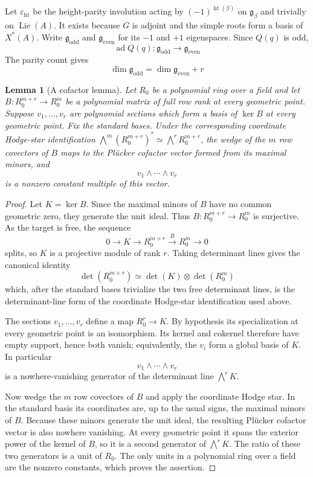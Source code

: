 \documentclass[11pt]{amsart}
\newtheorem{lemma}[lemma]{Lemma}
\theoremstyle{definition}
\theoremstyle{remark}
\newcommand{\Lie}{\operatorname{Lie}}
\newcommand{\ad}{\operatorname{ad}}
\newcommand{\g}{\mathfrak g}
\begin{document}
Let $\varepsilon_{\mathrm{ht}}$ be the height-parity involution acting by
$(-1)^{\operatorname{ht}(\beta)}$ on $\g_\beta$ and trivially on $\Lie(A)$.
It exists because $G$ is adjoint and the simple roots form a basis of
$X^*(A)$.  Write $\g_{\mathrm{odd}}$ and $\g_{\mathrm{even}}$ for its
$-1$ and $+1$ eigenspaces.  Since $Q(q)$ is odd,
\[
 \ad Q(q):\g_{\mathrm{odd}}\longrightarrow\g_{\mathrm{even}}
\]
The parity count gives
\begin{equation}\label{eq:g-parity-dimension}
 \dim\g_{\mathrm{odd}}=\dim\g_{\mathrm{even}}+r
\end{equation}

\begin{lemma}[A cofactor lemma]\label{lem:cofactor-kernel}
Let $R_0$ be a polynomial ring over a field and let
$B:R_0^{m+r}\to R_0^m$ be a polynomial matrix of full row rank at every
geometric point.  Suppose $v_1,\ldots,v_r$ are polynomial sections which form
a basis of $\ker B$ at every geometric point.  Fix the standard bases.  Under the corresponding coordinate Hodge-star
identification
$\bigwedge^m(R_0^{m+r})^*\simeq\bigwedge^rR_0^{m+r}$, the wedge of the
$m$ row covectors of $B$ maps to the Pl\"ucker cofactor vector formed from
its maximal minors, and
\[
 v_1\wedge\cdots\wedge v_r
\]
is a nonzero constant multiple of this vector.
\end{lemma}

\begin{proof}
Let $K=\ker B$.  Since the maximal minors of $B$ have no common geometric
zero, they generate the unit ideal.  Thus $B:R_0^{m+r}\to R_0^m$ is
surjective.  As the target is free, the sequence
\[
 0\longrightarrow K\longrightarrow R_0^{m+r}
 \xrightarrow{B}R_0^m\longrightarrow0
\]
splits, so $K$ is a projective module of rank $r$.  Taking determinant lines
gives the canonical identity
\[
 \det(R_0^{m+r})\simeq \det(K)\otimes\det(R_0^m)
\]
which, after the standard bases trivialize the two free determinant lines, is
the determinant-line form of the coordinate Hodge-star identification used
above.

The sections $v_1,\ldots,v_r$ define a map $R_0^r\to K$.  By hypothesis its
specialization at every geometric point is an isomorphism.  Its kernel and
cokernel therefore have empty support, hence both vanish; equivalently, the
$v_i$ form a global basis of $K$.  In particular
\[
 v_1\wedge\cdots\wedge v_r
\]
is a nowhere-vanishing generator of the determinant line $\bigwedge^rK$.

Now wedge the $m$ row covectors of $B$ and apply the coordinate Hodge star.
In the standard basis its coordinates are, up to the usual signs, the
maximal minors of $B$.  Because these minors generate the unit ideal, the
resulting Pl\"ucker cofactor vector is also nowhere vanishing.  At every
geometric point it spans the exterior power of the kernel of $B$, so it is a
second generator of $\bigwedge^rK$.  The ratio of these two generators is a
unit of $R_0$.  The only units in a polynomial ring over a field are the
nonzero constants, which proves the assertion.
\end{proof}
\end{document}
